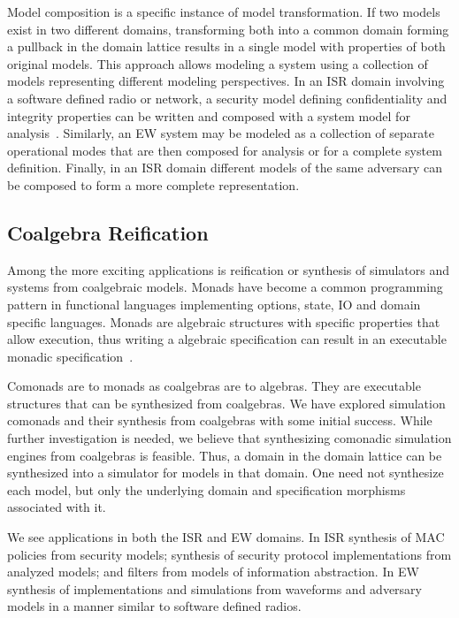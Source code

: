 \documentclass[12pt]{article}
\begin{document}
Model composition is a specific instance of model transformation.  If two models exist in
two different domains, transforming both into a common domain forming a pullback in the
domain lattice results in a single model with properties of both original models.  This
approach allows modeling a system using a collection of models representing different
modeling perspectives.  In an ISR domain involving a software defined radio or network, a
security model defining confidentiality and integrity properties can be written and
composed with a system model for analysis~\cite{Kimmell:08:System-Synthesi}.  Similarly,
an EW system may be modeled as a collection of separate operational modes that are then
composed for analysis or for a complete system definition.  Finally, in an ISR domain
different models of the same adversary can be composed to form a more complete
representation.

\subsection{Coalgebra Reification}

Among the more exciting applications is reification or synthesis of simulators and systems
from coalgebraic models.  Monads have become a common programming pattern in functional
languages implementing options, state, IO and domain specific languages.  Monads are
algebraic structures with specific properties that allow execution, thus writing a
algebraic specification can result in an executable monadic
specification~\cite{Kimmell:08:Synthesizing-So,Peck:11:Hardware/Softwa}.

Comonads are to monads as coalgebras are to algebras.  They are executable structures that
can be synthesized from coalgebras.  We have explored simulation comonads and their
synthesis from coalgebras with some initial success.  While further investigation is
needed, we believe that synthesizing comonadic simulation engines from coalgebras is
feasible.  Thus, a domain in the domain lattice can be synthesized into a simulator for
models in that domain.  One need not synthesize each model, but only the underlying domain
and specification morphisms associated with it.

We see applications in both the ISR and EW domains.  In ISR synthesis of MAC policies from
security models; synthesis of security protocol implementations from analyzed models; and
filters from models of information abstraction.  In EW synthesis of implementations and
simulations from waveforms and adversary models in a manner similar to software defined
radios.

\begin{small}

\end{small}
\end{document}
